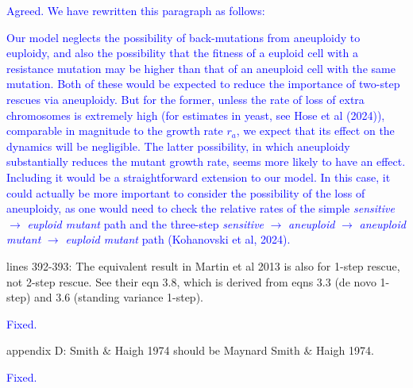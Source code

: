 \documentclass[12pt]{extarticle}
\begin{document}
\textcolor{blue}{Agreed. We have rewritten this paragraph as follows:
\begin{displayquote}
    Our model neglects the possibility of back-mutations from aneuploidy to euploidy, and also the possibility that the fitness of a euploid cell with a resistance mutation may be higher than that of an aneuploid cell with the same mutation. 
    Both of these would be expected to reduce the importance of two-step rescues via aneuploidy.
    But for the former, unless the rate of loss of extra chromosomes is extremely high (for estimates in yeast, see Hose et al (2024)), comparable in magnitude to the growth rate $r_a$, we expect that its effect on the dynamics will be negligible.
    The latter possibility, in which aneuploidy substantially reduces the mutant growth rate, seems more likely
    to have an effect. 
    Including it would be a straightforward extension to our model.
    In this case, it could actually be more important to consider the possibility of the loss of aneuploidy, 
    as one would need to check the relative rates of the simple \textit{sensitive} $\rightarrow$ \textit{euploid mutant} path and the three-step \textit{sensitive} $\rightarrow$ \textit{aneuploid} $\rightarrow$ \textit{aneuploid mutant} $\rightarrow$ \textit{euploid mutant} path (Kohanovski et al, 2024).
\end{displayquote}
}

lines 392-393: The equivalent result in Martin et al 2013 is also for 1-step rescue, not 2-step rescue. See their eqn 3.8, which is derived from eqns 3.3 (de novo 1-step) and 3.6 (standing variance 1-step).

\textcolor{blue}{Fixed.}

appendix D: Smith $\&$ Haigh 1974 should be Maynard Smith $\&$ Haigh 1974.

\textcolor{blue}{Fixed.}

%
%
%
%
%
%
%





\end{document}
